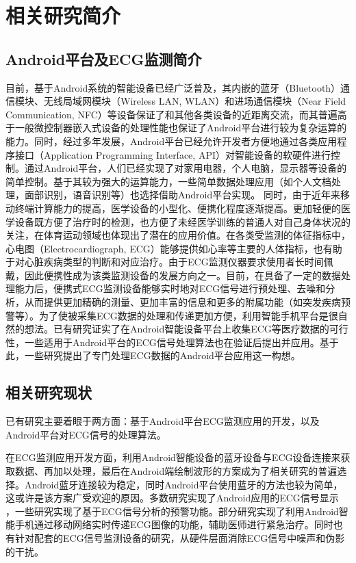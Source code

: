 \setcounter{page}{1}
\xiaosihao

\section{相关研究简介}
\subsection{Android平台及ECG监测简介}
目前，基于Android系统的智能设备已经广泛普及\cite{IDCStatic}\cite{StatistaStatic}，其内嵌的蓝牙（Bluetooth）通信模块、无线局域网模块（Wireless LAN, WLAN）和进场通信模块（Near Field Communication, NFC）等设备保证了和其他各类设备的近距离交流，而其普遍高于一般微控制器嵌入式设备的处理性能也保证了Android平台进行较为复杂运算的能力。同时，经过多年发展，Android平台已经允许开发者方便地通过各类应用程序接口（Application Programming Interface, API）对智能设备的软硬件进行控制。通过Android平台，人们已经实现了对家用电器，个人电脑，显示器等设备的简单控制。基于其较为强大的运算能力，一些简单数据处理应用（如个人文档处理，面部识别，语音识别等）也选择借助Android平台实现。
同时，由于近年来移动终端计算能力的提高，医学设备的小型化、便携化程度逐渐提高。更加轻便的医学设备既方便了治疗时的检测，也方便了未经医学训练的普通人对自己身体状况的关注，在体育运动领域也体现出了潜在的应用价值\cite{moreno}。在各类受监测的体征指标中，心电图（Electrocardiograph, ECG）能够提供如心率等主要的人体指标，也有助于对心脏疾病类型的判断和对应治疗。由于ECG监测仪器要求使用者长时间佩戴，因此便携性成为该类监测设备的发展方向之一。目前，在具备了一定的数据处理能力后，便携式ECG监测设备能够实时地对ECG信号进行预处理、去噪和分析，从而提供更加精确的测量、更加丰富的信息和更多的附属功能（如突发疾病预警等）。为了使被采集ECG数据的处理和传递更加方便，利用智能手机平台是很自然的想法。已有研究证实了在Android智能设备平台上收集ECG等医疗数据的可行性，一些适用于Android平台的ECG信号处理算法也在验证后提出并应用。基于此，一些研究提出了专门处理ECG数据的Android平台应用这一构想。

\subsection{相关研究现状}

已有研究主要着眼于两方面：基于Android平台ECG监测应用的开发，以及Android平台对ECG信号的处理算法。

在ECG监测应用开发方面，利用Android智能设备的蓝牙设备与ECG设备连接来获取数据、再加以处理，最后在Android端绘制波形的方案成为了相关研究的普遍选择。Android蓝牙连接较为稳定\cite{xiaojintang}，同时Android平台使用蓝牙的方法也较为简单，这或许是该方案广受欢迎的原因。多数研究实现了Android应用的ECG信号显示\cite{moreno} \cite{dongdonglou} \cite{xiaoqiangguo}，一些研究实现了基于ECG信号分析的预警功能\cite{xiaoqiangguo}。部分研究实现了利用Android智能手机通过移动网络实时传递ECG图像的功能，辅助医师进行紧急治疗\cite{dongdonglou}\cite{xiaoqiangguo}。同时也有针对配套的ECG信号监测设备的研究，从硬件层面消除ECG信号中噪声和伪影的干扰\cite{moreno}。

